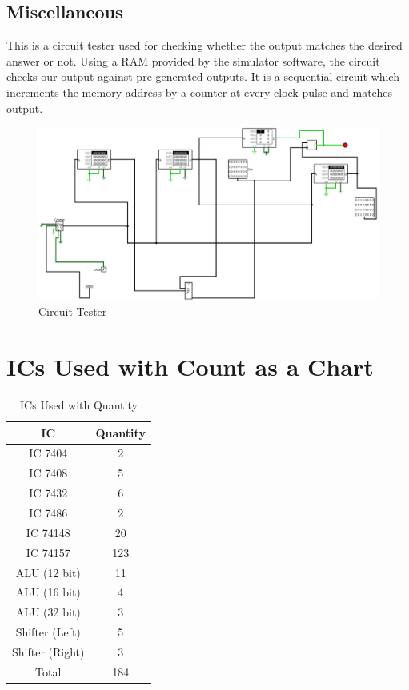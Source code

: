 \documentclass[12pt]{article}
\begin{document}
\subsection{Miscellaneous}
This is a circuit tester used for checking whether the output matches the desired answer or not. Using a RAM provided by the simulator software, the circuit checks our output against pre-generated outputs. It is a sequential circuit which increments the memory address by a counter at every clock pulse and matches output. 
\vspace{1cm}
\begin{figure}[H]
    \centering
        \includegraphics[width=\textwidth]{images/Circuit_Tester_Using_RAM.jpg}
    \caption{Circuit Tester}\label{fig:circtest}
\end{figure}




\newpage





\section{\large{ICs Used with Count as a Chart}}

\begin{table}[!h]
	\centering
	\begin{tabular}{|c|c|}
		\hline
		\textbf{IC} & \textbf{Quantity}  \\
		\hline
		IC 7404 & 2 \\
		IC 7408 & 5 \\
		IC 7432 & 6 \\
		IC 7486 & 2 \\
		IC 74148 & 20 \\
		IC 74157 & 123 \\
		ALU (12 bit) & 11 \\
		ALU (16 bit) & 4 \\
		ALU (32 bit) & 3 \\
		Shifter (Left) & 5 \\
		Shifter (Right) & 3 \\
		\hline
		Total & 184  \\
		\hline
	\end{tabular}
	\caption{ICs Used with Quantity}
	\label{tab:ic_quantity}
\end{table}
\end{document}
